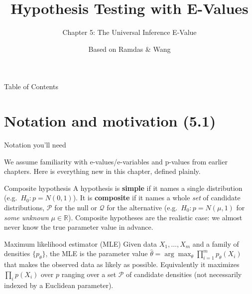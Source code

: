 \documentclass[aspectratio=169,10pt]{beamer}
\title[E-Values -- Ch.5]{Hypothesis Testing with E-Values}
\subtitle{Chapter 5: The Universal Inference E-Value}
\author{Based on Ramdas \& Wang}
\date{}
\newcommand{\R}{\mathbb{R}}
\newcommand{\calP}{\mathcal{P}}
\newcommand{\calQ}{\mathcal{Q}}
\begin{document}
\begin{frame}
  \titlepage
\end{frame}

\begin{frame}{Table of Contents}
  \tableofcontents
\end{frame}

\section{Notation and motivation (5.1)}

\begin{frame}[allowframebreaks]{Notation you'll need}

  We assume familiarity with e-values/e-variables and p-values from
  earlier chapters. Here is everything new in this chapter, defined
  plainly.

  \begin{block}{Composite hypothesis}
    A hypothesis is \textbf{simple} if it names a single distribution
    (e.g.\ $H_0: p = N(0,1)$). It is \textbf{composite} if it names a
    whole \emph{set} of candidate distributions, $\calP$ for the null
    or $\calQ$ for the alternative (e.g.\ $H_0: p = N(\mu,1)$ for
    \emph{some unknown} $\mu \in \R$). Composite hypotheses are the
    realistic case: we almost never know the true parameter value in
    advance.
  \end{block}

  \begin{block}{Maximum likelihood estimator (MLE)}
    Given data $X_1,\ldots,X_m$ and a family of densities
    $\{p_\theta\}$, the MLE is the parameter value
    $\hat\theta = \arg\max_\theta \prod_{i=1}^m p_\theta(X_i)$ that
    makes the observed data as likely as possible. Equivalently it
    maximizes $\prod_i p(X_i)$ over $p$ ranging over a set $\calP$ of
    candidate densities (not necessarily indexed by a Euclidean
    parameter).
  \end{block}

  \framebreak


\end{frame}
\end{document}

